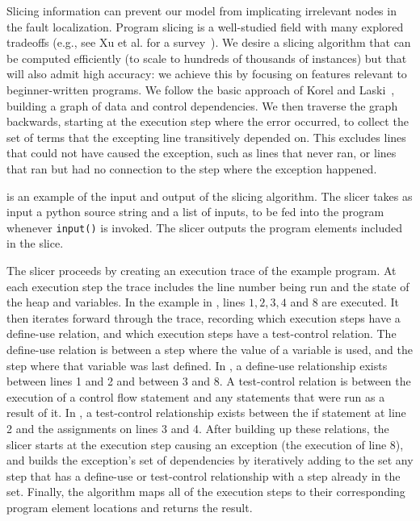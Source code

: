 \documentclass[conference]{IEEEtran}
\newcommand\lt[1]{{\lstinline|#1|}}
\begin{document}
Slicing information can prevent our model from implicating irrelevant
nodes in the fault localization. Program slicing is a well-studied
field with many explored tradeoffs (e.g., see Xu et al. for a
survey~\cite{xu2005}). We desire a slicing algorithm that can be computed
efficiently (to scale to hundreds of thousands of instances) but that will
also admit high accuracy: we achieve this by focusing on features relevant
to beginner-written programs. We
follow the basic approach of Korel and Laski~\cite{KOREL1988155,
KOREL1990187}, building a
graph of data and control dependencies. We then traverse the graph
backwards, starting at the execution step where the error occurred, to
collect the set of terms that the excepting line transitively depended on.
This excludes lines that could not have caused the exception, such as lines
that never ran, or lines that ran but had no connection to the step where
the exception happened.

 is an example of the input and output of the slicing
algorithm. The slicer takes as input a python source string and a list of inputs,
to be fed into the program whenever \lt{input()} is invoked. The slicer outputs
the program elements included in the slice.

The slicer proceeds by creating an execution trace of the example program.
At each execution step the trace includes the line number being run and the state of the
heap and variables. In the example in ,
lines $1, 2, 3, 4$ and $8$ are executed.
It then iterates forward through the trace, recording which
execution steps have a define-use relation, and which execution steps
have a test-control relation. The define-use relation is between a step where
the value of a variable is used, and the step where that variable was last
defined. In , a define-use relationship exists
between lines 1 and 2 and between 3 and 8. A test-control relation is between
the execution of a control flow statement and any statements that were run as
a result of it. In , a test-control relationship exists
between the if statement at line 2 and the assignments on lines 3 and 4. After
building up these relations, the slicer starts at the execution step causing an
exception (the execution of line 8), and builds the exception's set of
dependencies by iteratively adding to the set any step that has a define-use
or test-control relationship with a step already in the set. Finally, the
algorithm maps all of the execution steps to their corresponding program
element locations and returns the result.
\end{document}
